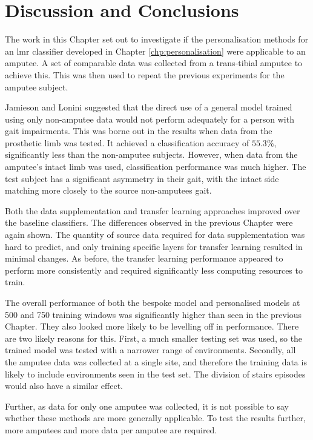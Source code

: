 \section{Discussion and Conclusions}
\label{sec:amputee-discussion}
The work in this Chapter set out to investigate if the personalisation methods for an \acrshort{lmr} classifier developed in Chapter \ref{chp:personalisation} were applicable to an amputee. A set of comparable data was collected from a trans-tibial amputee to achieve this. This was then used to repeat the previous experiments for the amputee subject.

Jamieson and Lonini suggested that the direct use of a general model trained using only non-amputee data would not perform adequately for a person with gait impairments\cite{Lonini2016, Jamieson2021}. This was borne out in the results when data from the prosthetic limb was tested. It achieved a classification accuracy of $55.3\%$, significantly less than the non-amputee subjects. However, when data from the amputee's intact limb was used, classification performance was much higher. The test subject has a significant asymmetry in their gait, with the intact side matching more closely to the source non-amputees gait.

Both the data supplementation and transfer learning approaches improved over the baseline classifiers. The differences observed in the previous Chapter were again shown. The quantity of source data required for data supplementation was hard to predict, and only training specific layers for transfer learning resulted in minimal changes. As before, the transfer learning performance appeared to perform more consistently and required significantly less computing resources to train.

The overall performance of both the bespoke model and personalised models at 500 and 750 training windows was significantly higher than seen in the previous Chapter. They also looked more likely to be levelling off in performance. There are two likely reasons for this. First, a much smaller testing set was used, so the trained model was tested with a narrower range of environments. Secondly, all the amputee data was collected at a single site, and therefore the training data is likely to include environments seen in the test set. The division of stairs episodes would also have a similar effect. 

Further, as data for only one amputee was collected, it is not possible to say whether these methods are more generally applicable. To test the results further, more amputees and more data per amputee are required. 

